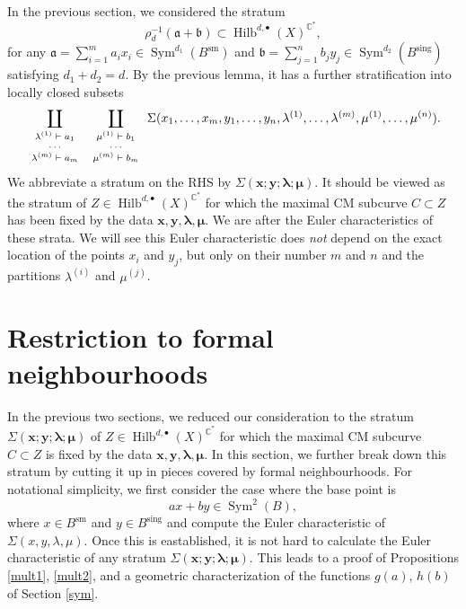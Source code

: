 \documentclass{amsart}
\theoremstyle{definition}
\newcommand{\CC} {\mathbb{C}}          %
\newcommand{\Sym}{\operatorname{Sym}}
\newcommand{\Hilb}{\operatorname{Hilb}}
\newcommand{\sm}{\operatorname{sm}}
\newcommand{\sing}{\operatorname{sing}}
\begin{document}

In the previous section, we considered the stratum
$$
\rho_{d}^{-1} ( \mathfrak{a} + \mathfrak{b} ) \subset \Hilb^{d, \bullet}(X)^{\CC^*},
$$
for any $\mathfrak{a} = \sum_{i=1}^{m} a_i x_i \in \Sym^{d_1}(B^{\sm})$ and $\mathfrak{b} = \sum_{j=1}^{n} b_j y_j \in \Sym^{d_2}(B^{\sing})$ satisfying $d_1+d_2=d$. By the previous lemma, it has a further stratification into locally closed subsets
\begin{equation} \label{comps}
\coprod_{{\scriptsize{\begin{array}{c} \lambda^{(1)} \vdash a_1 \\ \cdots \\ \lambda^{(m)} \vdash a_m \end{array}}}} \coprod_{\scriptsize{\begin{array}{c} \mu^{(1)} \vdash b_1 \\ \cdots \\ \mu^{(m)} \vdash b_m \end{array}}} \Sigma(x_1, \ldots, x_m, y_1, \ldots, y_n, \lambda^{(1)}, \ldots, \lambda^{(m)}, \mu^{(1)}, \ldots, \mu^{(n)}).
\end{equation}
We abbreviate a stratum on the RHS by $\Sigma(\boldsymbol{x};\boldsymbol{y};\boldsymbol{\lambda};\boldsymbol{\mu})$. It should be viewed as the stratum of $Z \in \Hilb^{d,\bullet}(X)^{\CC^*}$ for which the maximal CM subcurve $C \subset Z$ has been fixed by the data $\boldsymbol{x}, \boldsymbol{y}, \boldsymbol{\lambda}, \boldsymbol{\mu}$. We are after the Euler characteristics of these strata. We will see this Euler characteristic does \emph{not} depend on the exact location of the points $x_i$ and $y_j$, but only on their number $m$ and $n$ and the partitions $\lambda^{(i)}$ and $\mu^{(j)}$.


\section{Restriction to formal neighbourhoods} \label{formal}

In the previous two sections, we reduced our consideration to the stratum $\Sigma(\boldsymbol{x};\boldsymbol{y};\boldsymbol{\lambda};\boldsymbol{\mu})$ of $Z \in \Hilb^{d,\bullet}(X)^{\CC^*}$ for which the maximal CM subcurve $C \subset Z$ is fixed by the data $\boldsymbol{x}, \boldsymbol{y}, \boldsymbol{\lambda}, \boldsymbol{\mu}$. In this section, we further break down this stratum by cutting it up in pieces covered by formal neighbourhoods. For notational simplicity, we first consider the case where the base point is 
$$
a x + b y \in \Sym^2(B),
$$
where $x \in B^{\sm}$ and $y \in B^{\sing}$ and compute the Euler characteristic of $\Sigma(x,y,\lambda,\mu)$. Once this is eastablished, it is not hard to calculate the Euler characteristic of any stratum  $\Sigma(\boldsymbol{x};\boldsymbol{y};\boldsymbol{\lambda};\boldsymbol{\mu})$. This leads to a proof of Propositions \ref{mult1}, \ref{mult2}, and a geometric characterization of the functions $g(a)$, $h(b)$ of Section \ref{sym}.
\end{document}
